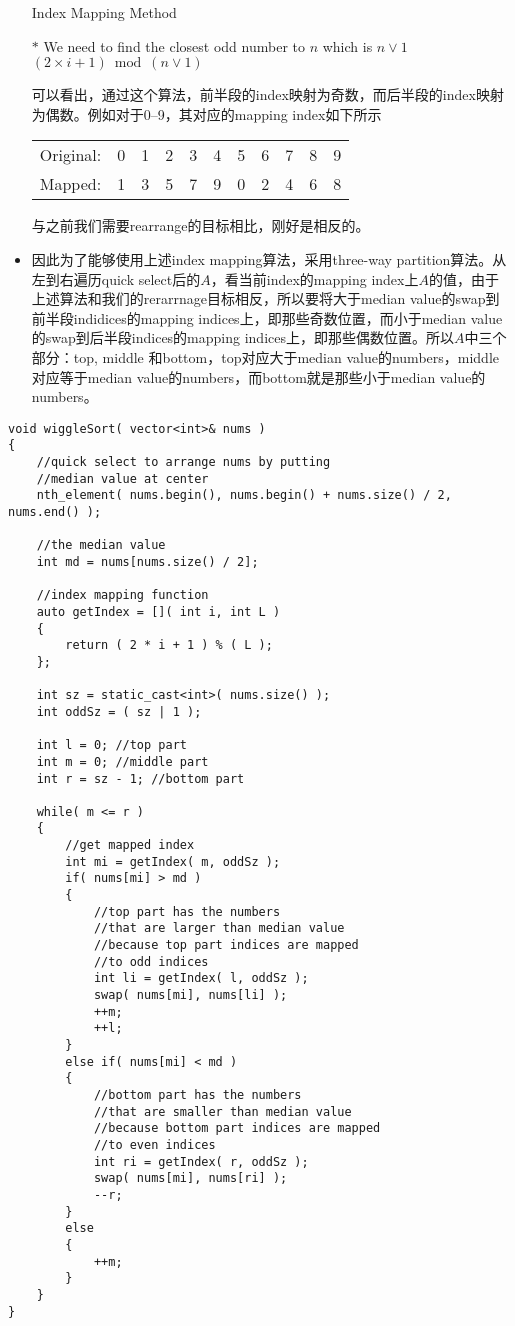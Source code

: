 \begin{itemize}
\setcounter{algorithm}{0}
\begin{algorithm}[H]
\caption{Index Mapping Method}
\begin{algorithmic}[1]
\State $\ast$ We need to find the closest odd number to $n$ which is $n\lor 1$
\State \Return $(2\times i +1)\bmod(n\lor 1)$ 
\EndProcedure
\end{algorithmic}
\end{algorithm}
可以看出，通过这个算法，前半段的index映射为奇数，而后半段的index映射为偶数。例如对于0--9，其对应的mapping index如下所示
\begin{table}[H]
\begin{tabular}{l*{10}{c}}
Original: &  0 & 1 & 2 & 3 & 4 & 5 & 6 & 7 & 8 & 9 \\
Mapped: & 1  &  3 &   5 &   7 &  9 &   0  &  2  &  4 &   6 &   8
\end{tabular}
\end{table}
与之前我们需要rearrange的目标相比，刚好是相反的。
\item 因此为了能够使用上述index mapping算法，采用three-way partition算法。从左到右遍历quick select后的$A$，看当前index的mapping index上$A$的值，由于上述算法和我们的rerarrnage目标相反，所以要将大于median value的swap到前半段indidices的mapping indices上，即那些奇数位置，而小于median value的swap到后半段indices的mapping indices上，即那些偶数位置。所以$A$中三个部分：top, middle 和bottom，top对应大于median value的numbers，middle对应等于median value的numbers，而bottom就是那些小于median value的numbers。
\end{itemize}
\begin{lstlisting}[style=customc, caption={Quick Select And Three-way Partition}]
void wiggleSort( vector<int>& nums )
{
    //quick select to arrange nums by putting
    //median value at center
    nth_element( nums.begin(), nums.begin() + nums.size() / 2, nums.end() );

    //the median value
    int md = nums[nums.size() / 2];

    //index mapping function
    auto getIndex = []( int i, int L )
    {
        return ( 2 * i + 1 ) % ( L );
    };

    int sz = static_cast<int>( nums.size() );
    int oddSz = ( sz | 1 );

    int l = 0; //top part
    int m = 0; //middle part
    int r = sz - 1; //bottom part

    while( m <= r )
    {
        //get mapped index
        int mi = getIndex( m, oddSz );
        if( nums[mi] > md )
        {
            //top part has the numbers
            //that are larger than median value
            //because top part indices are mapped
            //to odd indices
            int li = getIndex( l, oddSz );
            swap( nums[mi], nums[li] );
            ++m;
            ++l;
        }
        else if( nums[mi] < md )
        {
            //bottom part has the numbers
            //that are smaller than median value
            //because bottom part indices are mapped
            //to even indices
            int ri = getIndex( r, oddSz );
            swap( nums[mi], nums[ri] );
            --r;
        }
        else
        {
            ++m;
        }
    }
}

\end{lstlisting}
